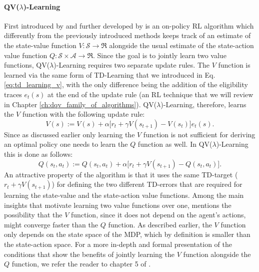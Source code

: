 \paragraph{\textbf{\uppercase{QV}($\lambda$)-\uppercase{L}earning}} First introduced by \citet{wiering2005qv} and further developed by \citet{wiering2009qv} is an on-policy RL algorithm which differently from the previously introduced methods keeps track of an estimate of the state-value function $V:\mathcal{S}\rightarrow\Re$ alongside the usual estimate of the state-action value function $Q:\mathcal{S}\times\mathcal{A}\rightarrow\Re$. Since the goal is to jointly learn two value functions, QV($\lambda$)-Learning requires two separate update rules. The $V$ function is learned via the same form of TD-Learning that we introduced in Eq. \ref{eq:td_learning_v}, with the only difference being the addition of the eligibility traces $e_t(s)$ at the end of the update rule (an RL technique that we will review in Chapter \ref{ch:dqv_family_of_algorithms}). QV($\lambda$)-Learning, therefore, learns the $V$ function with the following update rule:
\begin{equation}
V(s):= V(s) + \alpha \big[ r_{t} + \gamma V(s_{t+1}) - V(s_t) \big] e_{t}(s).
\label{eqch02:qv_lambda_v_update}
\end{equation}
Since as discussed earlier only learning the $V$ function is not sufficient for deriving an optimal policy one needs to learn the $Q$ function as well. In QV($\lambda$)-Learning this is done as follows:
\begin{equation}
Q(s_{t}, a_{t}):= Q(s_{t}, a_{t}) + \alpha \big[r_{t} + \gamma V(s_{t+1}) - Q(s_{t}, a_{t}) \big].
\label{eqch02:qv_lambda_q_update}
\end{equation}
An attractive property of the algorithm is that it uses the same TD-target ($r_t + \gamma V(s_{t+1})$) for defining the two different TD-errors that are required for learning the state-value and the state-action value functions. Among the main insights that motivate learning two value functions over one, \citet{wiering2005qv} mentions the possibility that the $V$ function, since it does not depend on the agent's actions, might converge faster than the $Q$ function. As described earlier, the $V$ function only depends on the state space of the MDP, which by definition is smaller than the state-action space. For a more in-depth and formal presentation of the conditions that show the benefits of jointly learning the $V$ function alongside the $Q$ function, we refer the reader to chapter 5 of \cite{van2011insights}.


